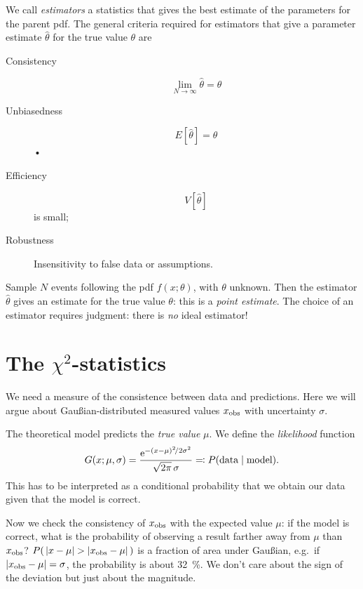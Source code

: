 We call \emph{estimators} a statistics that gives the best estimate of the parameters for the parent \ac{pdf}.
The general criteria required for estimators that give a parameter estimate $\hat\theta$ for the true value $\theta$ are
\begin{description}
	\item[Consistency]
		\begin{equation}
			\lim_{N\to\infty}\hat\theta = \theta
		\end{equation}
	\item[Unbiasedness]
		\begin{equation}
			E[\hat\theta] = \theta
		\end{equation}•
	\item[Efficiency]
		\begin{equation}
			V[\hat\theta]
		\end{equation}
		is small;
	\item[Robustness] Insensitivity to false data or assumptions.
\end{description}



Sample $N$ events following the \ac{pdf} $f(x;\theta)$, with $\theta$ unknown.
Then the estimator $\hat\theta$ gives an estimate for the true value $\theta$: this is a \emph{point estimate}.
The choice of an estimator requires judgment: there is \emph{no} ideal estimator!

\section{The $\chi^2$-statistics}

We need a measure of the consistence between data and predictions.
Here we will argue about Gau\ss{}ian-distributed measured values $x_\textup{obs}$ with uncertainty $\sigma$.


The theoretical model predicts the \emph{true value} $\mu$.
We define the \emph{likelihood} function
\begin{equation}
	G(x; \mu, \sigma) = \frac{\mathrm{e}^{-(x-\mu)^2\!/2\sigma^2} }{\sqrt{2\pi}\,\sigma} \eqqcolon P( \text{data}\mid\text{model}).
\end{equation}
This has to be interpreted as a conditional probability that we obtain our data given that the model is correct.


Now we check the consistency of $x_\textup{obs}$ with the expected value $\mu$: if the model is correct, what is the probability of observing a result farther away from $\mu$ than $x_\textup{obs}$?
$P( \,\lvert x - \mu\rvert > \lvert x_\textup{obs}-\mu\rvert \, )$ is a fraction of area under Gau\ss{}ian, e.g.~if $\lvert x_\textup{obs} - \mu\rvert = \sigma$, the probability is about \SI{32}{\percent}.
We don't care about the sign of the deviation but just about the magnitude.


